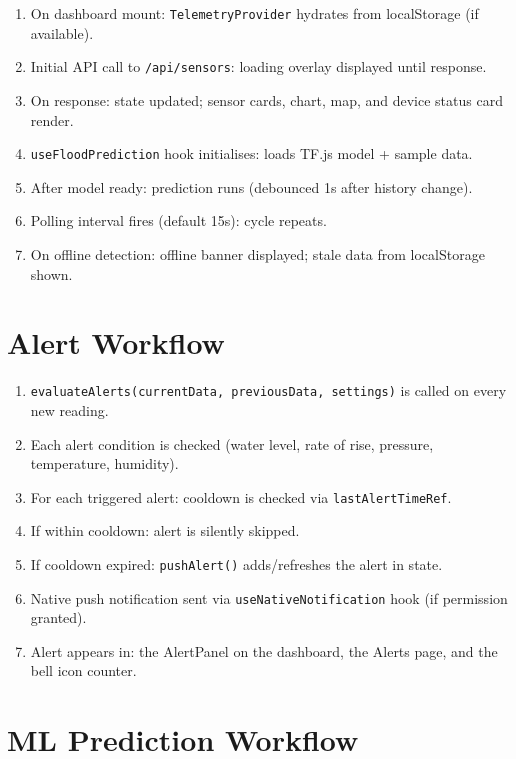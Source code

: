 \begin{enumerate}[leftmargin=1.5em]
  \item On dashboard mount: \texttt{TelemetryProvider} hydrates from localStorage (if available).
  \item Initial API call to \texttt{/\allowbreak{}api/\allowbreak{}sensors}: loading overlay displayed until response.
  \item On response: state updated; sensor cards, chart, map, and device status card render.
  \item \texttt{useFloodPrediction} hook initialises: loads TF.js model + sample data.
  \item After model ready: prediction runs (debounced 1s after history change).
  \item Polling interval fires (default 15s): cycle repeats.
  \item On offline detection: offline banner displayed; stale data from localStorage shown.
\end{enumerate}

\section{Alert Workflow}

\begin{enumerate}[leftmargin=1.5em]
  \item \texttt{evaluateAlerts(currentData,\allowbreak{} previousData,\allowbreak{} settings)} is called on every new reading.
  \item Each alert condition is checked (water level, rate of rise, pressure, temperature, humidity).
  \item For each triggered alert: cooldown is checked via \texttt{lastAlertTimeRef}.
  \item If within cooldown: alert is silently skipped.
  \item If cooldown expired: \texttt{pushAlert()} adds/refreshes the alert in state.
  \item Native push notification sent via \texttt{useNativeNotification} hook (if permission granted).
  \item Alert appears in: the AlertPanel on the dashboard, the Alerts page, and the bell icon counter.
\end{enumerate}

\section{ML Prediction Workflow}

